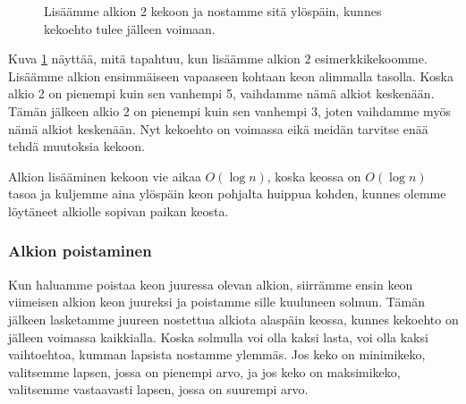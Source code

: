 \begin{figure}
\caption{Lisäämme alkion 2 kekoon ja nostamme sitä ylöspäin,
kunnes kekoehto tulee jälleen voimaan.}
\label{fig:keklis}
\end{figure}

Kuva \ref{fig:keklis} näyttää, mitä tapahtuu, kun lisäämme
alkion  $2$ esimerkkikekoomme.
Lisäämme alkion ensimmäiseen vapaaseen kohtaan
keon alimmalla tasolla.
Koska alkio 2 on pienempi kuin sen vanhempi 5,
vaihdamme nämä alkiot keskenään.
Tämän jälkeen alkio 2 on pienempi kuin sen vanhempi 3,
joten vaihdamme myös nämä alkiot keskenään.
Nyt kekoehto on voimassa eikä meidän tarvitse enää
tehdä muutoksia kekoon.

Alkion lisääminen kekoon vie aikaa $O(\log n)$,
koska keossa on $O(\log n)$ tasoa ja kuljemme aina
ylöspäin keon pohjalta huippua kohden,
kunnes olemme löytäneet alkiolle sopivan paikan keosta.

\subsubsection{Alkion poistaminen}

Kun haluamme poistaa keon juuressa olevan alkion,
siirrämme ensin keon viimeisen alkion keon juureksi
ja poistamme sille kuuluneen solmun.
Tämän jälkeen lasketamme juureen nostettua alkiota
alaspäin keossa, kunnes kekoehto on jälleen voimassa kaikkialla.
Koska solmulla voi olla kaksi lasta,
voi olla kaksi vaihtoehtoa,
kumman lapsista nostamme ylemmäs.
Jos keko on minimikeko, valitsemme lapsen,
jossa on pienempi arvo,
ja jos keko on maksimikeko, valitsemme vastaavasti
lapsen, jossa on suurempi arvo.

